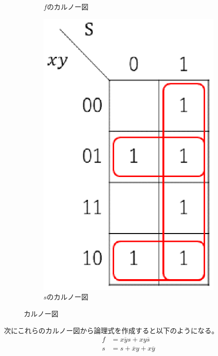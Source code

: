 \documentclass{jsarticle}
\begin{document}
\begin{description}
\begin{description}
\begin{figure}[H]
\begin{subfigure}{0.2\columnwidth}
                    \caption{$f$のカルノー図}
                    \label{fig6_f}
                \end{subfigure}
                \begin{subfigure}{0.2\columnwidth}
                    \centering
                    \includegraphics[width=\columnwidth]{fig_6_s.eps}
                    \caption{$s$のカルノー図}
                    \label{fig6_s}
                \end{subfigure}
                \caption{カルノー図}
                \label{fig6}
            \end{figure}

            次にこれらのカルノー図から論理式を作成すると以下のようになる。
            \begin{align}
                f &= \overline{x y s} + xy\overline{s} \\
                s &= s + \overline{x}y + x\overline{y}
            \end{align}


\end{description}
\end{description}
\end{document}
